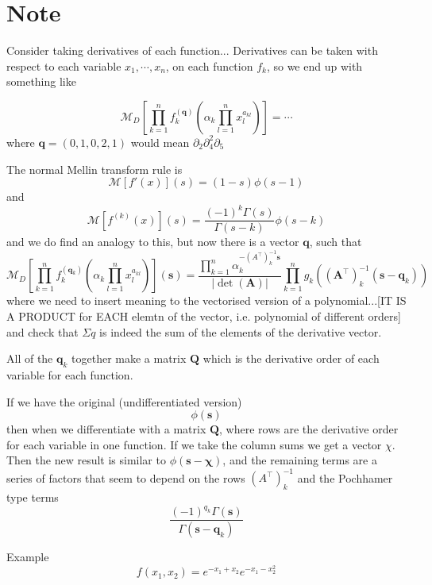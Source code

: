 \documentclass{article}
\begin{document}
\section{Note}
Consider taking derivatives of each function...
Derivatives can be taken with respect to each variable $x_1, \cdots, x_n$, on each function $f_k$, so we end up with something like

$$
\mathcal{M}_D\left[\prod_{k=1}^n f^{(\mathbf{q})}_k \left(\alpha_k \prod_{l=1}^n x_l^{a_{kl}}\right) \right]= \cdots
$$
where $\mathbf{q} = (0,1,0,2,1)$ would mean $\partial_2 \partial_4^2 \partial_5$

The normal Mellin transform rule is 
$$
\mathcal{M}[f'(x)](s) = (1-s)\phi(s-1)
$$
and
$$
\mathcal{M}[f^{(k)}(x)](s) = \frac{(-1)^k \Gamma(s)}{\Gamma(s-k)}\phi(s-k)
$$
and we do find an analogy to this, but now there is a vector $\mathbf{q}$, such that
$$
\mathcal{M}_D\left[\prod_{k=1}^n f^{(\mathbf{q}_k)}_k \left(\alpha_k \prod_{l=1}^n x_l^{a_{kl}}\right) \right](\mathbf{s})= \frac{\prod_{k=1}^n \alpha_k^{-(A^\top)_k^{-1} \mathbf{s}}}{|\det(\mathbf{A})|} \prod_{k=1}^n  g_k((\mathbf{A}^\top)_k^{-1} (\mathbf{s-q}_k))
$$
where we need to insert meaning to the vectorised version of a polynomial...[IT IS A PRODUCT for EACH elemtn of the vector, i.e. polynomial of different orders] and check that $\Sigma q$ is indeed the sum of the elements of the derivative vector.

All of the $\mathbf{q}_k$ together make a matrix $\mathbf{Q}$ which is the derivative order of each variable for each function.

If we have the original (undifferentiated version)
$$
\phi(\mathbf{s})
$$
then when we differentiate with a matrix $\mathbf{Q}$, where rows are the derivative order for each variable in one function. If we take the column sums we get a vector $\chi$. Then the new result is similar to $\phi(\mathbf{s-\chi})$, and the remaining terms are a series of factors that seem to depend on the rows $(A^\top)_k^{-1}$ and the Pochhamer type terms 
$$
\frac{(-1)^{q_k}\Gamma(\mathbf{s})}{\Gamma(\mathbf{s-q}_k)}
$$


Example
$$
f(x_1,x_2) = e^{-x_1+x_2}e^{-x_1 - x_2^2}
$$
\end{document}
